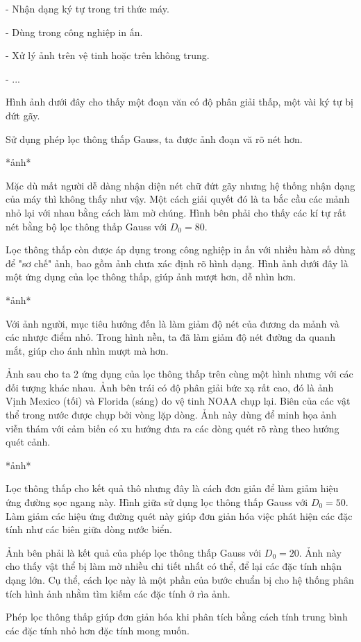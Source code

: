 \documentclass[12pt,a4paper]{report}
\numberwithin{equation}{section}
\theoremstyle{definition} %
\begin{document}
- Nhận dạng ký tự trong tri thức máy.

- Dùng trong công nghiệp in ấn.

- Xử lý ảnh trên vệ tinh hoặc trên không trung.

- ...

Hình ảnh dưới đây cho thấy một đoạn văn có độ phân giải thấp, một vài ký tự bị đứt gãy. 

Sử dụng phép lọc thông thấp Gauss, ta được ảnh đoạn vă rõ nét hơn.

*ảnh*

Mặc dù mất người dễ dàng nhận diện nét chữ đứt gãy nhưng hệ thống nhận dạng của máy thì không thấy như vậy. Một cách giải quyết đó là ta bắc cầu các mảnh nhỏ lại với nhau bằng cách làm mờ chúng. Hình bên phải cho thấy các kí tự rất nét bằng bộ lọc thông thấp Gauss với $D_0 = 80$.

Lọc thông thấp còn được áp dụng trong công nghiệp in ấn với nhiều hàm số dùng để "sơ chế" ảnh, bao gồm ảnh chưa xác định rõ hình dạng. Hình ảnh dưới đây là một ứng dụng của lọc thông thấp, giúp ảnh mượt hơn, dễ nhìn hơn.

*ảnh*

Với ảnh người, mục tiêu hướng đến là làm giảm độ nét của đương da mảnh và các nhược điểm nhỏ. Trong hình nền, ta đã làm giảm độ nét đường da quanh mắt, giúp cho ánh nhìn mượt mà hơn.

Ảnh sau cho ta 2 ứng dụng của lọc thông thấp trên cùng một hình nhưng với các đối tượng khác nhau. Ảnh bên trái có độ phân giải bức xạ rất cao, đó là ảnh Vịnh Mexico (tối) và Florida (sáng) do vệ tinh NOAA chụp lại. Biên của các vật thể trong nước được chụp bởi vòng lặp dòng. Ảnh này dùng để minh họa ảnh viễn thám với cảm biến có xu hướng đưa ra các dòng quét rõ ràng theo hướng quét cảnh.

*ảnh*

Lọc thông thấp cho kết quả thô nhưng đây là cách đơn giản để làm giảm hiệu ứng đường sọc ngang này. Hình giữa sử dụng lọc thông thấp Gauss với $D_0=50$. Làm giảm các hiệu ứng đường quét này giúp đơn giản hóa việc phát hiện các đặc tính như các biên giữa dòng nước biển.

Ảnh bên phải là kết quả của phép lọc thông thấp Gauss với $D_0=20$. Ảnh này cho thấy vật thể bị làm mờ nhiều chi tiết nhất có thể, để lại các đặc tính nhận dạng lớn. Cụ thể, cách lọc này là một phần của bước chuẩn bị cho hệ thống phân tích hình ảnh nhằm tìm kiếm các đặc tính ở rìa ảnh.

Phép lọc thông thấp giúp đơn giản hóa khi phân tích bằng cách tính trung bình các đặc tính nhỏ hơn đặc tính mong muốn.
\end{document}
